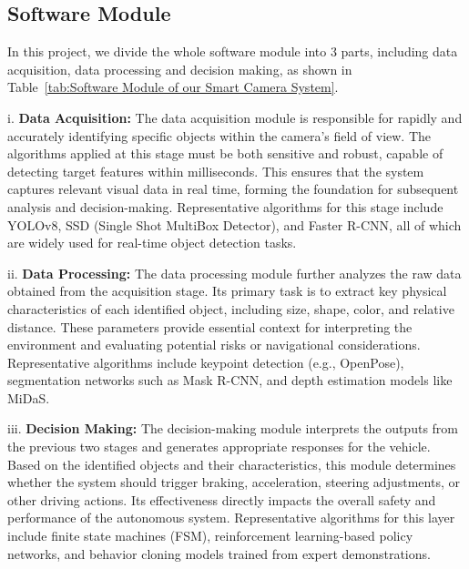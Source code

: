 \documentclass[journal,transmag]{IEEEtran}
\begin{document}
\subsection{Software Module}

In this project, we divide the whole software module into 3 parts, including data acquisition, data processing and decision making, as shown in Table~\ref{tab:Software Module of our Smart Camera System}. 

i. \textbf{Data Acquisition: }The data acquisition module is responsible for rapidly and accurately identifying specific objects within the camera’s field of view. The algorithms applied at this stage must be both sensitive and robust, capable of detecting target features within milliseconds. This ensures that the system captures relevant visual data in real time, forming the foundation for subsequent analysis and decision-making. Representative algorithms for this stage include YOLOv8, SSD (Single Shot MultiBox Detector), and Faster R-CNN, all of which are widely used for real-time object detection tasks.

ii. \textbf{Data Processing: }The data processing module further analyzes the raw data obtained from the acquisition stage. Its primary task is to extract key physical characteristics of each identified object, including size, shape, color, and relative distance. These parameters provide essential context for interpreting the environment and evaluating potential risks or navigational considerations. Representative algorithms include keypoint detection (e.g., OpenPose), segmentation networks such as Mask R-CNN, and depth estimation models like MiDaS.

iii. \textbf{Decision Making: } The decision-making module interprets the outputs from the previous two stages and generates appropriate responses for the vehicle. Based on the identified objects and their characteristics, this module determines whether the system should trigger braking, acceleration, steering adjustments, or other driving actions. Its effectiveness directly impacts the overall safety and performance of the autonomous system. Representative algorithms for this layer include finite state machines (FSM), reinforcement learning-based policy networks, and behavior cloning models trained from expert demonstrations.
\end{document}
